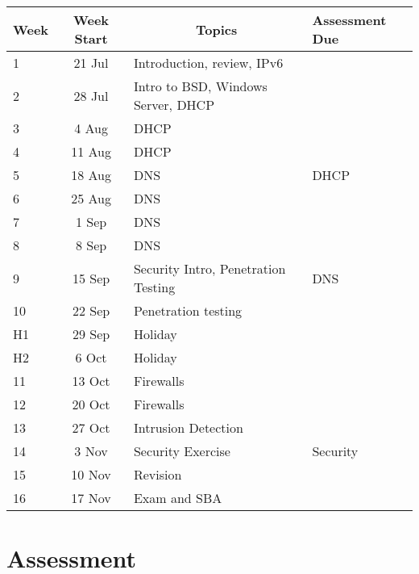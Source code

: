 \documentclass{article}
\begin{document}
\renewcommand{\arraystretch}{1.5}
\begin{tabular}{|l|c|l|l|}
\hline
 Week & Week Start & \multicolumn{1}{c|}{Topics}               & Assessment Due   \\ \hline
 1    & 21 Jul     & Introduction, review, IPv6                &   \\ \hline
 2    & 28 Jul     & Intro to BSD, Windows Server, DHCP        &   \\ \hline
 3    &  4 Aug     & DHCP                                      &   \\ \hline
 4    & 11 Aug     & DHCP                                      &   \\ \hline
 5    & 18 Aug     & DNS                                       & DHCP  \\ \hline
 6    & 25 Aug     & DNS                                       &   \\ \hline
 7    &  1 Sep     & DNS                                       &   \\ \hline
 8    &  8 Sep     & DNS                                       &   \\ \hline
 9    & 15 Sep     & Security Intro, Penetration Testing       & DNS  \\ \hline
 10   & 22 Sep     & Penetration testing                       &   \\ \hline
 H1   & 29 Sep     & Holiday                                   &   \\ \hline
 H2   &  6 Oct     & Holiday                                   &   \\ \hline
 11   & 13 Oct     & Firewalls                                 &   \\ \hline
 12   & 20 Oct     & Firewalls                                 &   \\ \hline
 13   & 27 Oct     & Intrusion Detection                       &   \\ \hline
 14   &  3 Nov     & Security Exercise                         & Security  \\ \hline
 15   & 10 Nov     & Revision                                  &   \\ \hline
 16   & 17 Nov     & Exam and SBA                              &   \\ \hline
\end{tabular}

\section*{Assessment}
\end{document}
